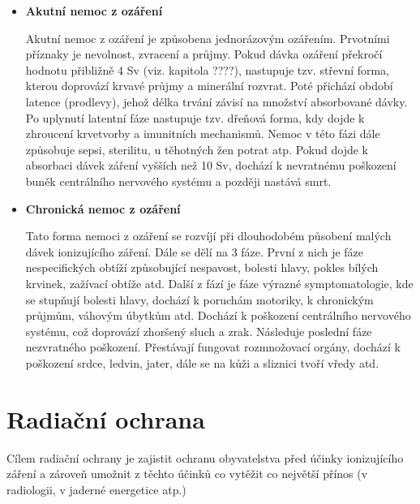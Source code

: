 \begin{itemize}
	\item \textbf{Akutní nemoc z ozáření}
	
		Akutní nemoc z ozáření je způsobena jednorázovým ozářením. Prvotními příznaky je nevolnost, zvracení a průjmy. Pokud dávka ozáření překročí hodnotu přibližně 4 Sv (viz. kapitola ????), nastupuje tzv. střevní forma, kterou doprovází krvavé průjmy a minerální rozvrat. Poté přichází období latence (prodlevy), jehož délka trvání závisí na množství absorbované dávky. Po uplynutí latentní fáze nastupuje tzv. dřeňová forma, kdy dojde k zhroucení krvetvorby a imunitních mechanismů. Nemoc v této fázi dále způsobuje sepsi, sterilitu, u těhotných žen potrat atp. Pokud dojde k absorbaci dávek záření vyšších než 10 Sv, dochází k nevratnému poškození buněk centrálního nervového systému a později nastává smrt.
		
	\item \textbf{Chronická nemoc z ozáření}
	
		Tato forma nemoci z ozáření se rozvíjí při dlouhodobém působení malých dávek ionizujícího záření. Dále se dělí na 3 fáze. První z nich je fáze nespecifických obtíží způsobující nespavost, bolesti hlavy, pokles bílých krvinek, zažívací obtíže atd. Další z fází je fáze výrazné symptomatologie, kde se stupňují bolesti hlavy, dochází k poruchám motoriky, k chronickým průjmům, váhovým úbytkům atd. Dochází k poškození centrálního nervového systému, což doprovází zhoršený sluch a zrak. Následuje poslední fáze nezvratného poškození. Přestávají fungovat rozmnožovací orgány, dochází k poškození srdce, ledvin, jater, dále se na kůži a sliznici tvoří vředy atd. 
\end{itemize}

\section{Radiační ochrana} %
Cílem radiační ochrany je zajistit ochranu obyvatelstva před účinky ionizujícího záření a zároveň umožnit z těchto účinků co vytěžit co největší přínos (v radiologii, v jaderné energetice atp.) 
		








